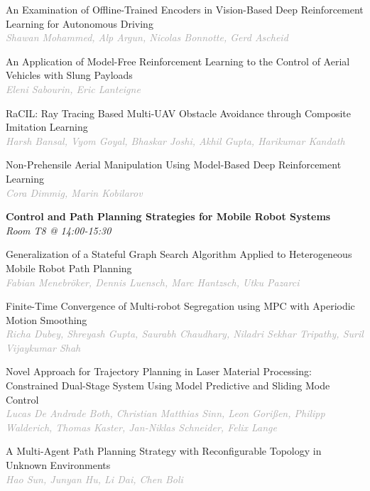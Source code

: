 \begin{multicols*}{2}
\small An Examination of Offline-Trained Encoders in Vision-Based Deep Reinforcement Learning for Autonomous Driving\\ 
\footnotesize \textcolor{darkgray}{\textit{Shawan Mohammed, Alp  Argun, Nicolas  Bonnotte, Gerd  Ascheid}}

\small An Application of Model-Free Reinforcement Learning to the Control of Aerial Vehicles with Slung Payloads\\ 
\footnotesize \textcolor{darkgray}{\textit{Eleni Sabourin, Eric  Lanteigne}}

\small RaCIL: Ray Tracing Based Multi-UAV Obstacle Avoidance through Composite Imitation Learning\\ 
\footnotesize \textcolor{darkgray}{\textit{Harsh Bansal, Vyom  Goyal, Bhaskar  Joshi, Akhil  Gupta, Harikumar  Kandath}}

\small Non-Prehensile Aerial Manipulation Using Model-Based Deep Reinforcement Learning\\ 
\footnotesize \textcolor{darkgray}{\textit{Cora Dimmig, Marin  Kobilarov}}

\normalsize \textbf{Control and Path Planning Strategies for Mobile Robot Systems}\\
\small \textit{Room T8 @ 14:00-15:30}

\small Generalization of a Stateful Graph Search Algorithm Applied to Heterogeneous Mobile Robot Path Planning\\ 
\footnotesize \textcolor{darkgray}{\textit{Fabian Menebröker, Dennis  Luensch, Marc  Hantzsch, Utku  Pazarci}}

\small Finite-Time Convergence of Multi-robot Segregation using MPC with Aperiodic Motion Smoothing\\ 
\footnotesize \textcolor{darkgray}{\textit{Richa Dubey, Shreyash  Gupta, Saurabh  Chaudhary, Niladri Sekhar  Tripathy, Suril Vijaykumar  Shah}}

\small Novel Approach for Trajectory Planning in Laser Material Processing: Constrained Dual-Stage System Using Model Predictive and Sliding Mode Control\\ 
\footnotesize \textcolor{darkgray}{\textit{Lucas De Andrade Both, Christian Matthias  Sinn, Leon  Gorißen, Philipp  Walderich, Thomas  Kaster, Jan-Niklas  Schneider, Felix  Lange}}

\small A Multi-Agent Path Planning Strategy with Reconfigurable Topology in Unknown Environments\\ 
\footnotesize \textcolor{darkgray}{\textit{Hao Sun, Junyan  Hu, Li  Dai, Chen  Boli}}


\end{multicols*}
